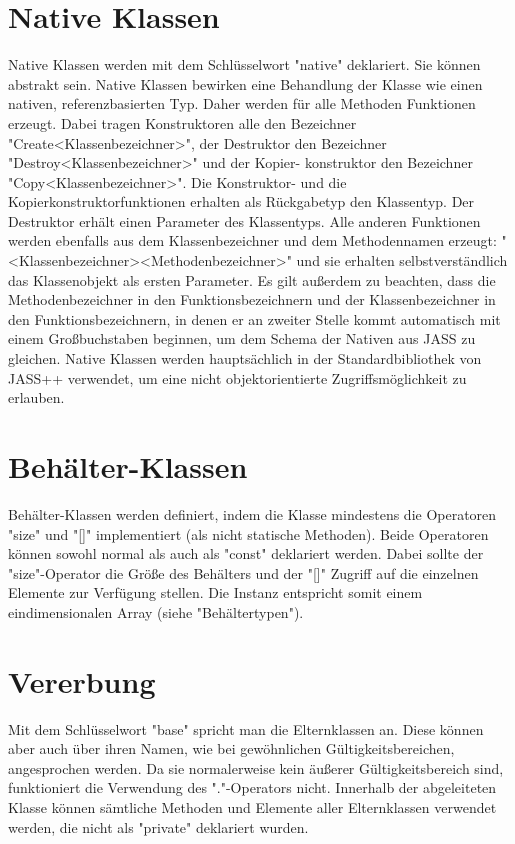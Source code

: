 \section{Native Klassen}
Native Klassen werden mit dem Schlüsselwort "native" deklariert. Sie können abstrakt sein.
Native Klassen bewirken eine Behandlung der Klasse wie einen nativen, referenzbasierten Typ.
Daher werden für alle Methoden Funktionen erzeugt. Dabei tragen Konstruktoren alle den Bezeichner
"Create<Klassenbezeichner>", der Destruktor den Bezeichner "Destroy<Klassenbezeichner>" und der Kopier-
konstruktor den Bezeichner "Copy<Klassenbezeichner>".
Die Konstruktor- und die Kopierkonstruktorfunktionen erhalten als Rückgabetyp den Klassentyp.
Der Destruktor erhält einen Parameter des Klassentyps.
Alle anderen Funktionen werden ebenfalls aus dem Klassenbezeichner und dem Methodennamen erzeugt:
"<Klassenbezeichner><Methodenbezeichner>" und sie erhalten selbstverständlich das Klassenobjekt als
ersten Parameter.
Es gilt außerdem zu beachten, dass die Methodenbezeichner in den Funktionsbezeichnern und der Klassenbezeichner in den
Funktionsbezeichnern, in denen er an zweiter Stelle kommt automatisch mit einem Großbuchstaben beginnen,
um dem Schema der Nativen aus JASS zu gleichen.
Native Klassen werden hauptsächlich in der Standardbibliothek von JASS++ verwendet, um eine nicht objektorientierte
Zugriffsmöglichkeit zu erlauben.

\section{Behälter-Klassen}
Behälter-Klassen werden definiert, indem die Klasse mindestens die Operatoren "size" und "[]" implementiert (als nicht statische Methoden).
Beide Operatoren können sowohl normal als auch als "const" deklariert werden.
Dabei sollte der "size"-Operator die Größe des Behälters und der "[]" Zugriff auf die einzelnen Elemente zur Verfügung stellen.
Die Instanz entspricht somit einem eindimensionalen Array (siehe "Behältertypen").

\section{Vererbung}
Mit dem Schlüsselwort "base" spricht man die Elternklassen an. Diese können aber auch über ihren Namen, wie bei gewöhnlichen
Gültigkeitsbereichen, angesprochen werden. Da sie normalerweise kein äußerer Gültigkeitsbereich sind, funktioniert die Verwendung des "."-Operators nicht.
Innerhalb der abgeleiteten Klasse können sämtliche Methoden und Elemente aller Elternklassen verwendet werden, die nicht als "private" deklariert wurden.

